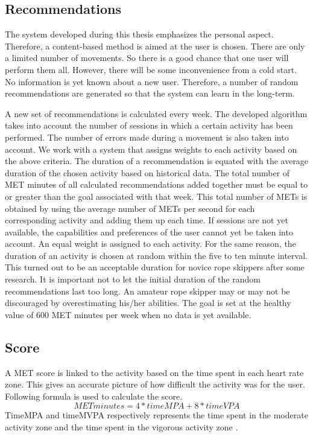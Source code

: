 \documentclass[twocolumn]{phdsymp} %
\begin{document}
\subsection{Recommendations}
The system developed during this thesis emphasizes the personal aspect. Therefore, a content-based method is aimed at the user is chosen. There are only a limited number of movements. So there is a good chance that one user will perform them all. However, there will be some inconvenience from a cold start. No information is yet known about a new user. Therefore, a number of random recommendations are generated so that the system can learn in the long-term.

A new set of recommendations is calculated every week. The developed algorithm takes into account the number of sessions in which a certain activity has been performed. The number of errors made during a movement is also taken into account. We work with a system that assigns weights to each activity based on the above criteria. The duration of a recommendation is equated with the average duration of the chosen activity based on historical data. The total number of MET minutes of all calculated recommendations added together must be equal to or greater than the goal associated with that week. This total number of METs is obtained by using the average number of METs per second for each corresponding activity and adding them up each time.
If sessions are not yet available, the capabilities and preferences of the user cannot yet be taken into account. An equal weight is assigned to each activity. For the same reason, the duration of an activity is chosen at random within the five to ten minute interval. This turned out to be an acceptable duration for novice rope skippers after some research. It is important not to let the initial duration of the random recommendations last too long. An amateur rope skipper may or may not be discouraged by overestimating his/her abilities. The goal is set at the healthy value of 600 MET minutes per week when no data is yet available.

\subsection{Score}
A MET score is linked to the activity based on the time spent in each heart rate zone. This gives an accurate picture of how difficult the activity was for the user. Following formula is used to calculate the score. 
\[METminutes = 4*timeMPA + 8*timeVPA\] 
TimeMPA and timeMVPA respectively represents the time spent in the moderate activity zone and the time spent in the vigorous activity zone \cite{ref21}.
\end{document}
